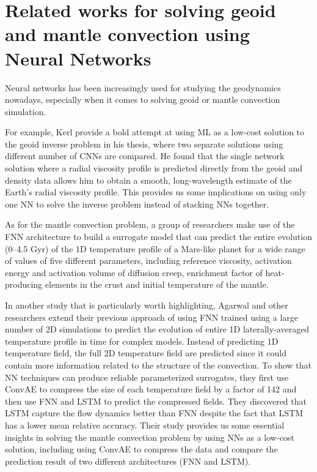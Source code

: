 \section{Related works for solving geoid and mantle convection using Neural Networks}

Neural networks has been increasingly used for studying the geodynamics nowadays, especially when it comes to solving geoid or mantle convection simulation. 

For example, Kerl provide a bold attempt at using ML as a low-cost solution to the geoid inverse problem in his thesis, where two separate solutions using different number of CNNs are compared.\citep{kerl2022geoid} He found that the single network solution where a radial viscosity profile is predicted directly from the geoid and density data allows him to obtain a smooth, long-wavelength estimate of the Earth's radial viscosity profile. This provides us some implications on using only one NN to solve the inverse problem instead of stacking NNs together.

As for the mantle convection problem, a group of researchers \citep{10.1093_gji_ggaa234} make use of the FNN architecture to build a surrogate model that can predict the entire evolution (0–4.5 Gyr) of the 1D temperature profile of a Mars-like planet for a wide range of values of five different parameters, including reference viscosity, activation energy and activation volume of diffusion creep, enrichment factor of heat-producing elements in the crust and initial temperature of the mantle.

In another study that is particularly worth highlighting, Agarwal and other researchers extend their previous approach \citep{10.1093_gji_ggaa234} of using FNN trained using a large number of 2D simulations to predict the evolution of entire 1D laterally-averaged temperature profile in time for complex models. Instead of predicting 1D temperature field, the full 2D temperature field are predicted since it could contain more information related to the structure of the convection.\citep{10.1103_physrevfluids.6.113801} To show that NN techniques can produce reliable parameterized surrogates, they first use ConvAE to compress the size of each temperature field by a factor of 142 and then use FNN and LSTM to predict the compressed fields. They discovered that LSTM capture the flow dynamics better than FNN despite the fact that LSTM has a lower mean relative accuracy. Their study provides us some essential insights in solving the mantle convection problem by using NNs as a low-cost solution, including using ConvAE to compress the data and compare the prediction result of two different architectures (FNN and LSTM).

